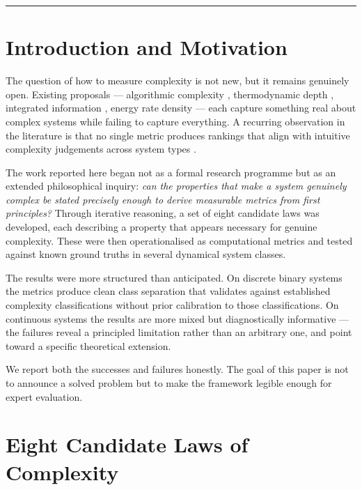 \documentclass[12pt,a4paper]{article}
\begin{document}
\rule{\linewidth}{0.4pt}

\section{Introduction and Motivation}

The question of how to measure complexity is not new, but it remains
genuinely open.
Existing proposals — algorithmic complexity \citep{kolmogorov1965},
thermodynamic depth \citep{lloyd1988}, integrated information
\citep{tononi2004}, energy rate density \citep{chaisson2001} — each
capture something real about complex systems while failing to capture
everything.
A recurring observation in the literature is that no single metric
produces rankings that align with intuitive complexity judgements across
system types \citep{gell-mann1996, ladyman2013}.

The work reported here began not as a formal research programme but as
an extended philosophical inquiry: \emph{can the properties that make
a system genuinely complex be stated precisely enough to derive
measurable metrics from first principles?}
Through iterative reasoning, a set of eight candidate laws was developed,
each describing a property that appears necessary for genuine complexity.
These were then operationalised as computational metrics and tested
against known ground truths in several dynamical system classes.

The results were more structured than anticipated.
On discrete binary systems the metrics produce clean class separation that
validates against established complexity classifications without prior
calibration to those classifications.
On continuous systems the results are more mixed but diagnostically
informative — the failures reveal a principled limitation rather than an
arbitrary one, and point toward a specific theoretical extension.

We report both the successes and failures honestly.
The goal of this paper is not to announce a solved problem but to make
the framework legible enough for expert evaluation.

\section{Eight Candidate Laws of Complexity}
\end{document}
